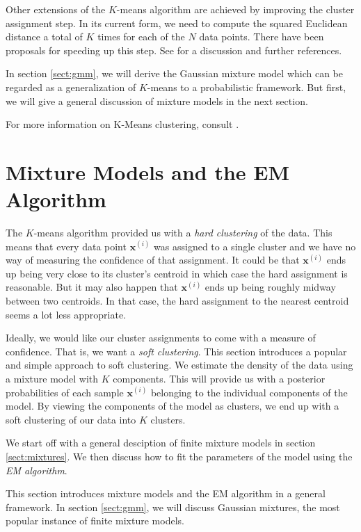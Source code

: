 \documentclass[final,3p,times,twocolumn]{elsarticle}
\let\bs\boldsymbol
\begin{document}
Other extensions of the $K$-means algorithm are achieved by improving the cluster assignment step.
In its current form, we need to compute the squared Euclidean distance a total of $K$ times for each of the $N$ data points.
There have been proposals for speeding up this step. See \cite{Bishop} for a discussion and further references.

In section \ref{sect:gmm}, we will derive the Gaussian mixture model which can be regarded as a generalization of $K$-means to a probabilistic framework.
But first, we will give a general discussion of mixture models in the next section.

For more information on K-Means clustering, consult \cite{Bishop,Murphy}.



\section{Mixture Models and the EM Algorithm}
\label{sect:fmm}
The $K$-means algorithm provided us with a \emph{hard clustering} of the data.
This means that every data point $\bs x^{(i)}$ was assigned to a single cluster and we have no way of measuring the confidence of that assignment.
It could be that $\bs x^{(i)}$ ends up being very close to its cluster's centroid in which case the hard assignment is reasonable.
But it may also happen that $\bs x^{(i)}$ ends up being roughly midway between two centroids.
In that case, the hard assignment to the nearest centroid seems a lot less appropriate.

Ideally, we would like our cluster assignments to come with a measure of confidence.
That is, we want a \emph{soft clustering}.
This section introduces a popular and simple approach to soft clustering.
We estimate the density of the data using a mixture model with $K$ components.
This will provide us with a posterior probabilities of each sample $\bs x^{(i)}$ belonging to the individual components of the model.
By viewing the components of the model as clusters, we end up with a soft clustering of our data into $K$ clusters.

We start off with a general desciption of finite mixture models in section \ref{sect:mixtures}.
We then discuss how to fit the parameters of the model using the \emph{EM algorithm}.

This section introduces mixture models and the EM algorithm in a general framework.
In section \ref{sect:gmm}, we will discuss Gaussian mixtures, the most popular instance of finite mixture models.
\end{document}
